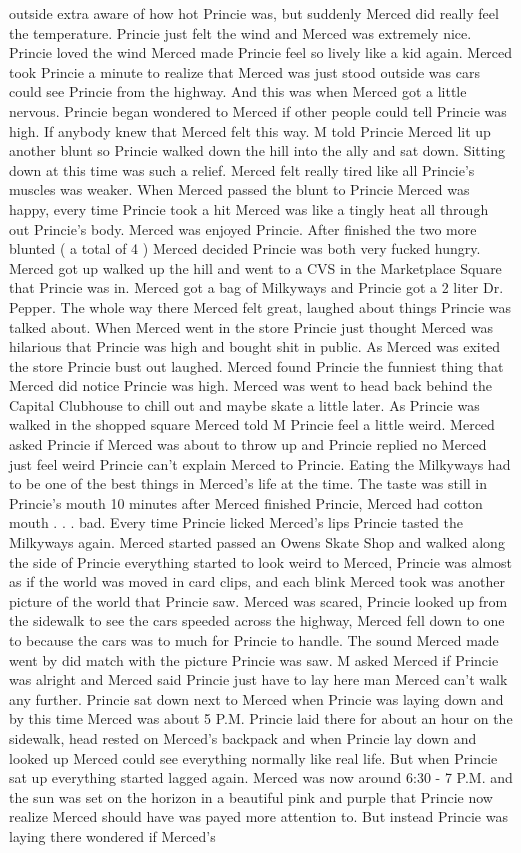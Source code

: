 \documentclass[12pt]{book}
\begin{document}
outside extra aware of how hot Princie was, but suddenly Merced did really feel the temperature. Princie just felt the wind and Merced was extremely nice. Princie loved the wind Merced made Princie feel so lively like a kid again. Merced took Princie a minute to realize that Merced was just stood outside was cars could see Princie from the highway. And this was when Merced got a little nervous. Princie began wondered to Merced if other people could tell Princie was high. If anybody knew that Merced felt this way. M told Princie Merced lit up another blunt so Princie walked down the hill into the ally and sat down. Sitting down at this time was such a relief. Merced felt really tired like all Princie's muscles was weaker. When Merced passed the blunt to Princie Merced was happy, every time Princie took a hit Merced was like a tingly heat all through out Princie's body. Merced was enjoyed Princie. After finished the two more blunted ( a total of 4 ) Merced decided Princie was both very fucked hungry. Merced got up walked up the hill and went to a CVS in the Marketplace Square that Princie was in. Merced got a bag of Milkyways and Princie got a 2 liter Dr. Pepper. The whole way there Merced felt great, laughed about things Princie was talked about. When Merced went in the store Princie just thought Merced was hilarious that Princie was high and bought shit in public. As Merced was exited the store Princie bust out laughed. Merced found Princie the funniest thing that Merced did notice Princie was high. Merced was went to head back behind the Capital Clubhouse to chill out and maybe skate a little later. As Princie was walked in the shopped square Merced told M Princie feel a little weird. Merced asked Princie if Merced was about to throw up and Princie replied no Merced just feel weird Princie can't explain Merced to Princie. Eating the Milkyways had to be one of the best things in Merced's life at the time. The taste was still in Princie's mouth 10 minutes after Merced finished Princie, Merced had cotton mouth . . .  bad. Every time Princie licked Merced's lips Princie tasted the Milkyways again. Merced started passed an Owens Skate Shop and walked along the side of Princie everything started to look weird to Merced, Princie was almost as if the world was moved in card clips, and each blink Merced took was another picture of the world that Princie saw. Merced was scared, Princie looked up from the sidewalk to see the cars speeded across the highway, Merced fell down to one to because the cars was to much for Princie to handle. The sound Merced made went by did match with the picture Princie was saw. M asked Merced if Princie was alright and Merced said Princie just have to lay here man Merced can't walk any further. Princie sat down next to Merced when Princie was laying down and by this time Merced was about 5 P.M. Princie laid there for about an hour on the sidewalk, head rested on Merced's backpack and when Princie lay down and looked up Merced could see everything normally like real life. But when Princie sat up everything started lagged again. Merced was now around 6:30 - 7 P.M. and the sun was set on the horizon in a beautiful pink and purple that Princie now realize Merced should have was payed more attention to. But instead Princie was laying there wondered if Merced's 
\end{document}
